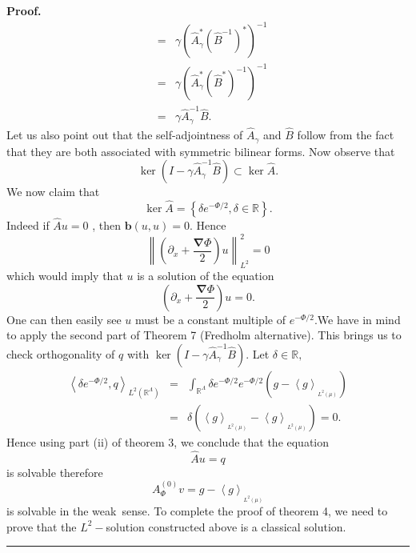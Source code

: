 \documentclass{article}
\newenvironment{proof}[1][Proof]{\noindent\textbf{#1.} }{\ \rule{0.5em}{0.5em}}
\begin{document}
\begin{proof}
\begin{eqnarray}
&=&\gamma \left( \hat{A}_{\gamma }^{\ast }\left( \hat{B}^{-1}\right) ^{\ast
}\right) ^{-1} \\
&=&\gamma \left( \hat{A}_{\gamma }^{\ast }\left( \hat{B}^{\ast }\right)
^{-1}\right) ^{-1} \\
&=&\gamma \hat{A}_{\gamma }^{-1}\hat{B}.
\end{eqnarray}%
Let us also point out that the self-adjointness of $\hat{A}_{\gamma }$ and $%
\hat{B}$ follow from the fact that they are both associated with symmetric
bilinear forms.\newline
Now observe that 
\begin{equation}
\ker (I-\gamma \hat{A}_{\gamma }^{-1}\hat{B})\subset \ker \hat{A}.
\end{equation}%
We now claim that 
\begin{equation}
\ker \hat{A}=\left\{ \delta e^{-\Phi /2},\delta \in \mathbb{R}\right\} .
\end{equation}%
Indeed if $\hat{A}u=0$ , then $\mathbf{b}(u,u)=0.$ Hence 
\begin{equation*}
\left\| \left( \partial _{x}+\dfrac{\mathbf{\nabla }\Phi }{2}\right)
u\right\| _{L^{2}}^{2}=0
\end{equation*}%
which would imply that $u$ is a solution of the equation%
\begin{equation*}
\left( \partial _{x}+\dfrac{\mathbf{\nabla }\Phi }{2}\right) u=0.
\end{equation*}%
One can then easily see $u$ must be a constant multiple of $e^{-\Phi /2}.$We
have in mind to apply the second part of Theorem 7 (Fredholm alternative).
This brings us to check orthogonality of $q$ with $\ker (I-\gamma \hat{A}%
_{\gamma }^{-1}\hat{B}).$ Let $\delta \in \mathbb{R},$%
\begin{eqnarray}
\left\langle \delta e^{-\Phi /2},q\right\rangle _{L^{2}(\mathbb{R}^{\Lambda
})} &=&\int_{\mathbb{R}^{\Lambda }}\delta e^{-\Phi /2}e^{-\Phi
/2}(g-\left\langle g\right\rangle _{_{L^{2}(\mu )}}) \\
&=&\delta \left( \left\langle g\right\rangle _{_{L^{2}(\mu )}}-\left\langle
g\right\rangle _{_{L^{2}(\mu )}}\right) =0.
\end{eqnarray}%
Hence using part (ii) of theorem 3, we conclude that the equation 
\begin{equation}
\hat{A}u=q
\end{equation}%
is solvable therefore%
\begin{equation}
A_{\Phi }^{(0)}v=g-\left\langle g\right\rangle _{_{L^{2}(\mu )}}
\end{equation}%
is solvable in the weak\ sense. To complete the proof of theorem 4, we need
to prove that the $L^{2}-$solution constructed above is a classical solution.
\end{proof}
\end{document}
